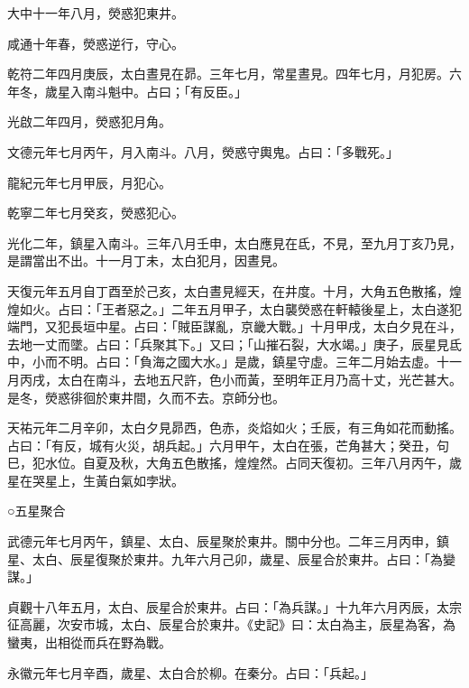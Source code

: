 \begin{pinyinscope}
 大中十一年八月，熒惑犯東井。



 咸通十年春，熒惑逆行，守心。



 乾符二年四月庚辰，太白晝見在昴。三年七月，常星晝見。四年七月，月犯房。六年冬，歲星入南斗魁中。占曰；「有反臣。」



 光啟二年四月，熒惑犯月角。



 文德元年七月丙午，月入南斗。八月，熒惑守輿鬼。占曰：「多戰死。」



 龍紀元年七月甲辰，月犯心。



 乾寧二年七月癸亥，熒惑犯心。



 光化二年，鎮星入南斗。三年八月壬申，太白應見在氐，不見，至九月丁亥乃見，是謂當出不出。十一月丁未，太白犯月，因晝見。



 天復元年五月自丁酉至於己亥，太白晝見經天，在井度。十月，大角五色散搖，煌煌如火。占曰：「王者惡之。」二年五月甲子，太白襲熒惑在軒轅後星上，太白遂犯端門，又犯長垣中星。占曰：「賊臣謀亂，京畿大戰。」十月甲戌，太白夕見在斗，去地一丈而墜。占曰：「兵聚其下。」又曰；「山摧石裂，大水竭。」庚子，辰星見氐中，小而不明。占曰：「負海之國大水。」是歲，鎮星守虛。三年二月始去虛。十一月丙戌，太白在南斗，去地五尺許，色小而黃，至明年正月乃高十丈，光芒甚大。是冬，熒惑徘徊於東井間，久而不去。京師分也。



 天祐元年二月辛卯，太白夕見昴西，色赤，炎焰如火；壬辰，有三角如花而動搖。占曰：「有反，城有火災，胡兵起。」六月甲午，太白在張，芒角甚大；癸丑，句巳，犯水位。自夏及秋，大角五色散搖，煌煌然。占同天復初。三年八月丙午，歲星在哭星上，生黃白氣如孛狀。



 ○五星聚合



 武德元年七月丙午，鎮星、太白、辰星聚於東井。關中分也。二年三月丙申，鎮星、太白、辰星復聚於東井。九年六月己卯，歲星、辰星合於東井。占曰：「為變謀。」



 貞觀十八年五月，太白、辰星合於東井。占曰：「為兵謀。」十九年六月丙辰，太宗征高麗，次安市城，太白、辰星合於東井。《史記》曰：太白為主，辰星為客，為蠻夷，出相從而兵在野為戰。



 永徽元年七月辛酉，歲星、太白合於柳。在秦分。占曰：「兵起。」




\end{pinyinscope}
